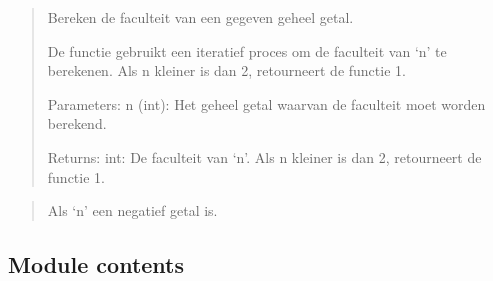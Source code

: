 \documentclass[letterpaper,10pt,english]{sphinxmanual}
\begin{document}
\begin{fulllineitems}
\label{\detokenize{chapter5:chapter5.recusions_demo.old_fac}}
\pysigstartsignatures
{}
\pysigstopsignatures\begin{quote}

\sphinxAtStartPar
Bereken de faculteit van een gegeven geheel getal.

\sphinxAtStartPar
De functie gebruikt een iteratief proces om de faculteit van ‘n’ te berekenen.
Als n kleiner is dan 2, retourneert de functie 1.

\sphinxAtStartPar
Parameters:
n (int): Het geheel getal waarvan de faculteit moet worden berekend.

\sphinxAtStartPar
Returns:
int: De faculteit van ‘n’. Als n kleiner is dan 2, retourneert de functie 1.
\end{quote}
\begin{quote}\begin{description}
\sphinxAtStartPar
{} \textendash{} Als ‘n’ een negatief getal is.

\end{description}\end{quote}

\end{fulllineitems}


\begin{fulllineitems}
\label{\detokenize{chapter5:chapter5.recusions_demo.sum_n}}
\pysigstartsignatures
{}
\pysigstopsignatures
\end{fulllineitems}



\subsection{Module contents}
\label{\detokenize{chapter5:module-chapter5}}\label{\detokenize{chapter5:module-contents}}
\sphinxstepscope
\end{document}
